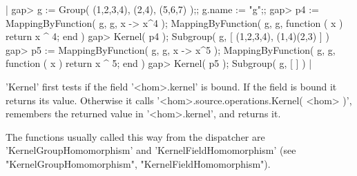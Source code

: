 |    gap> g := Group( (1,2,3,4), (2,4), (5,6,7) );;  g.name := "g";;
    gap> p4 := MappingByFunction( g, g, x -> x^4 );
    MappingByFunction( g, g, function ( x )
        return x ^ 4;
    end )
    gap> Kernel( p4 );
    Subgroup( g, [ (1,2,3,4), (1,4)(2,3) ] )
    gap> p5 := MappingByFunction( g, g, x -> x^5 );
    MappingByFunction( g, g, function ( x )
        return x ^ 5;
    end )
    gap> Kernel( p5 );
    Subgroup( g, [  ] ) |

'Kernel' first tests if the field  '<hom>.kernel' is bound.  If the field
is    bound     it    returns   its  value.        Otherwise   it   calls
'<hom>.source.operations.Kernel(  <hom> )',  remembers the returned value
in '<hom>.kernel', and returns it.

The  functions  usually  called   this  way   from  the  dispatcher   are
'KernelGroupHomomorphism'      and     'KernelFieldHomomorphism'     (see
"KernelGroupHomomorphism", "KernelFieldHomomorphism").




